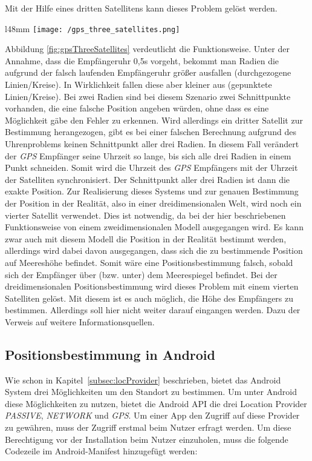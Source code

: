 Mit der Hilfe eines dritten Satellitens kann dieses Problem gelöst werden. 
\begin{wrapfigure}{l}{48mm}
	\centering
	\texttt{[image: /gps\_three\_satellites.png]}
	\caption[Lokalisierung: GPS 3 Satelliten]{GPS 3 Satelliten}
	\label{fig:gpsThreeSatellites}
\end{wrapfigure}
Abbildung \ref{fig:gpsThreeSatellites} verdeutlicht die Funktionsweise. Unter der Annahme, dass die Empfängeruhr 0,5s vorgeht, bekommt man Radien die aufgrund der falsch laufenden Empfängeruhr größer ausfallen (durchgezogene Linien/Kreise). In Wirklichkeit fallen diese aber kleiner aus (gepunktete Linien/Kreise). Bei zwei Radien sind bei diesem Szenario zwei Schnittpunkte vorhanden, die eine falsche Position angeben würden, ohne dass es eine Möglichkeit gäbe den Fehler zu erkennen. Wird allerdings ein dritter Satellit zur Bestimmung herangezogen, gibt es bei einer falschen Berechnung aufgrund des Uhrenproblems keinen Schnittpunkt aller drei Radien. In diesem Fall verändert der \textit{GPS} Empfänger seine Uhrzeit so lange, bis sich alle drei Radien in einem Punkt schneiden. Somit wird die Uhrzeit des \textit{GPS} Empfängers mit der Uhrzeit der Satelliten synchronisiert. Der Schnittpunkt aller drei Radien ist dann die exakte Position.
Zur Realisierung dieses Systems und zur genauen Bestimmung der Position in der Realität, also in einer dreidimensionalen Welt, wird noch ein vierter Satellit verwendet. Dies ist notwendig, da bei der hier beschriebenen Funktionsweise von einem zweidimensionalen Modell ausgegangen wird. Es kann zwar auch mit diesem Modell die Position in der Realität bestimmt werden, allerdings wird dabei davon ausgegangen, dass sich die zu bestimmende Position auf Meereshöhe befindet. Somit wäre eine Positionsbestimmung falsch, sobald sich der Empfänger über (bzw. unter) dem Meerespiegel befindet.
Bei der dreidimensionalen Positionsbestimmung wird dieses Problem mit einem vierten Satelliten gelöst. Mit diesem ist es auch möglich, die Höhe des Empfängers zu bestimmen. Allerdings soll hier nicht weiter darauf eingangen werden. Dazu der Verweis auf weitere Informationsquellen.

\subsection{Positionsbestimmung in Android}\label{subsec:posInAndroid}

Wie schon in Kapitel~\ref{subsec:locProvider} beschrieben, bietet das Android System drei Möglichkeiten um den Standort zu bestimmen. Um unter Android diese Möglichkeiten zu nutzen, bietet die Android API die drei Location Provider \textit{PASSIVE}, \textit{NETWORK} und \textit{GPS}.
Um einer App den Zugriff auf diese Provider zu gewähren, muss der Zugriff erstmal beim Nutzer erfragt werden. Um diese Berechtigung vor der Installation beim Nutzer einzuholen, muss die folgende Codezeile im Android-Manifest hinzugefügt werden:

